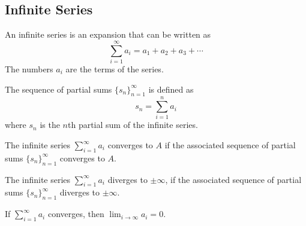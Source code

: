 \documentclass{article}
\begin{document}
\subsection{Infinite Series}
\begin{multicols}{2}
    \begin{definition}
        An infinite series is an expansion that can be written as
        \begin{equation*}
            \sum_{i=1}^\infty a_i = a_1 + a_2 + a_3 + \cdots
        \end{equation*}
        The numbers \(a_i\) are the terms of the series.
    \end{definition}
    \begin{definition}
        The sequence of partial sums \(\{s_n\}_{n=1}^\infty\) is defined as
        \begin{equation*}
            s_n = \sum_{i=1}^n a_i
        \end{equation*}
        where \(s_n\) is the \(n\)th partial sum of the infinite series.
    \end{definition}
    \columnbreak
    \begin{definition}
        The infinite series \(\sum_{i=1}^\infty a_i\) converges to \(A\) if the associated sequence of partial sums \(\{s_n\}_{n=1}^\infty\) converges to \(A\).
    \end{definition}
    \begin{definition}
        The infinite series \(\sum_{i=1}^\infty a_i\) diverges to \(\pm\infty\), if the associated sequence of partial sums \(\{s_n\}_{n=1}^\infty\) diverges to \(\pm\infty\).
    \end{definition}
    \begin{theorem}
        If \(\sum_{i=1}^{\infty}a_i\) converges, then \(\lim_{i\to\infty}a_i=0\).
    \end{theorem}
\end{multicols}
%
\end{document}

